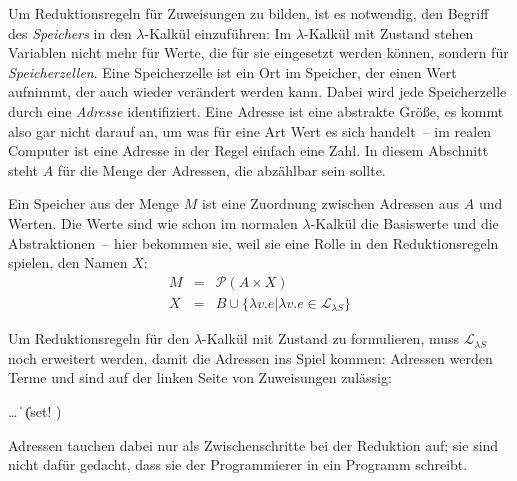 Um Reduktionsregeln für Zuweisungen zu bilden, ist es notwendig, den
Begriff des \textit{Speichers} in den $\lambda$-Kalkül
einzuführen: Im $\lambda$-Kalkül mit Zustand stehen Variablen nicht
mehr für Werte, die für sie eingesetzt werden können, sondern für
\textit{Speicherzellen}.  Eine Speicherzelle ist
ein Ort im Speicher, der einen Wert aufnimmt, der auch wieder
verändert werden kann.  Dabei wird jede Speicherzelle durch eine
\textit{Adresse} identifiziert.  Eine Adresse ist eine
abstrakte Größe, es kommt also gar nicht darauf an, um was für
eine Art Wert es sich handelt~-- im realen Computer ist eine Adresse
in der Regel einfach eine Zahl.  In diesem Abschnitt steht $A$ für die
Menge der Adressen, die abzählbar sein sollte.

Ein Speicher aus der Menge $M$ ist eine Zuordnung zwischen Adressen aus $A$
und Werten.  Die Werte sind wie schon im normalen
$\lambda$-Kalkül die Basiswerte und die Abstraktionen~-- hier bekommen
sie, weil sie eine Rolle in den Reduktionsregeln spielen, den Namen
$X$:
%
\begin{eqnarray*}
  M &=& \mathcal{P}(A\times X)\\
  X &=& B \cup \{ \lambda v.e | \lambda v.e \in \mathcal{L}_{\lambda{}S} \}
\end{eqnarray*}

Um Reduktionsregeln für den $\lambda$-Kalkül mit Zustand zu
formulieren, muss $\mathcal{L}_{\lambda{}S}$ noch erweitert werden,
damit die Adressen ins Spiel kommen: Adressen werden Terme und sind
auf der linken Seite von Zuweisungen zulässig:
%
\begin{grammar}
   \: \ldots
  \> \| 
  \> \| (set!  )
\end{grammar}
%
Adressen tauchen dabei nur als Zwischenschritte bei der Reduktion auf;
sie sind nicht dafür gedacht, dass sie der Programmierer in ein
Programm schreibt.

